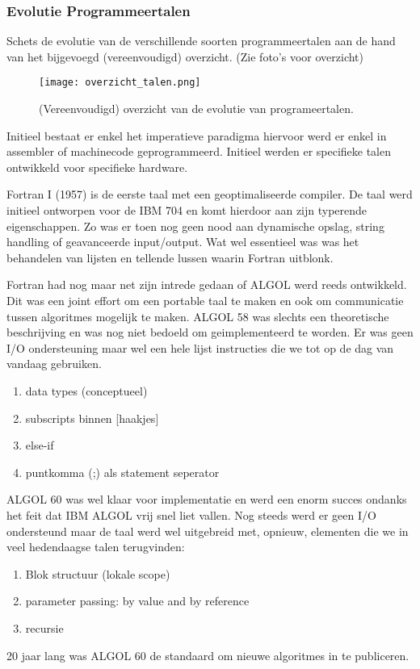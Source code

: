 \documentclass[../main.tex]{subfiles}
\begin{document}
\subsubsection{Evolutie Programmeertalen}
\begin{question}
Schets de evolutie van de verschillende soorten programmeertalen aan de hand van het bijgevoegd (vereenvoudigd) overzicht. (Zie foto's voor overzicht)
\begin{figure}
		\centering
		\texttt{[image: overzicht\_talen.png]}
		\caption{(Vereenvoudigd) overzicht van de evolutie van programeertalen.}
\end{figure}
\end{question}
\begin{solution}
Initieel bestaat er enkel het imperatieve paradigma hiervoor werd er enkel in assembler of machinecode geprogrammeerd.
Initieel werden er specifieke talen ontwikkeld voor specifieke hardware.

Fortran I (1957) is de eerste taal met een geoptimaliseerde compiler. 
De taal werd initieel ontworpen voor de IBM 704 en komt hierdoor aan zijn typerende eigenschappen.
Zo was er toen nog geen nood aan dynamische opslag, string handling of geavanceerde input/output.
Wat wel essentieel was was het behandelen van lijsten en tellende lussen waarin Fortran uitblonk.

Fortran had nog maar net zijn intrede gedaan of ALGOL werd reeds ontwikkeld.
Dit was een joint effort om een portable taal te maken en ook om communicatie tussen algoritmes mogelijk te maken. 
ALGOL 58 was slechts een theoretische beschrijving en was nog niet bedoeld om geimplementeerd te worden.
Er was geen I/O ondersteuning maar wel een hele lijst instructies die we tot op de dag van vandaag gebruiken.
\begin{enumerate}
		\item data types (conceptueel)
		\item subscripts binnen [haakjes]
		\item else-if
		\item puntkomma (;) als statement seperator  
\end{enumerate}
ALGOL 60 was wel klaar voor implementatie en werd een enorm succes ondanks het feit dat IBM ALGOL vrij snel liet vallen.
Nog steeds werd er geen I/O ondersteund maar de taal werd wel uitgebreid met, opnieuw, elementen die we in veel hedendaagse talen terugvinden:
\begin{enumerate}
		\item Blok structuur (lokale scope) 
		\item parameter passing: by value and by reference 
		\item recursie 
\end{enumerate}
20 jaar lang was ALGOL 60 de standaard om nieuwe algoritmes in te publiceren.


\end{solution}
\end{document}
